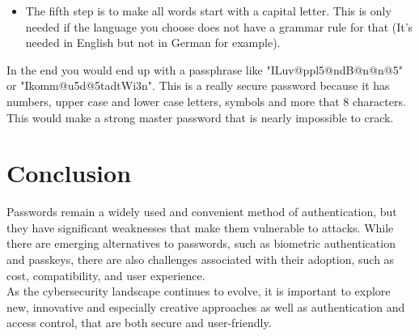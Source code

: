 \documentclass[conference]{IEEEtran}
\begin{document}
\begin{enumerate}
\begin{itemize}
\item The fifth step is to make all words start with a capital letter. This is only needed if the language you choose does not have a grammar rule for that (It's needed in English but not in German for example). 
\end{itemize}
In the end you would end up with a passphrase like "ILuv@ppl5@ndB@n@n@5" or "Ikomm@u5d@5tadtWi3n". This is a really secure password because it has numbers, upper case and lower case letters, symbols and more that 8 characters. This would make a strong master password that is nearly impossible to crack.
\end{enumerate}


\section{Conclusion}
Passwords remain a widely used and convenient method of authentication, but they have significant weaknesses that make them vulnerable to attacks. While there are emerging alternatives to passwords, such as biometric authentication and passkeys, there are also challenges associated with their adoption, such as cost, compatibility, and user experience.\\
As the cybersecurity landscape continues to evolve, it is important to explore new, innovative and especially creative approaches as well as authentication and access control, that are both secure and user-friendly.
\end{document}
